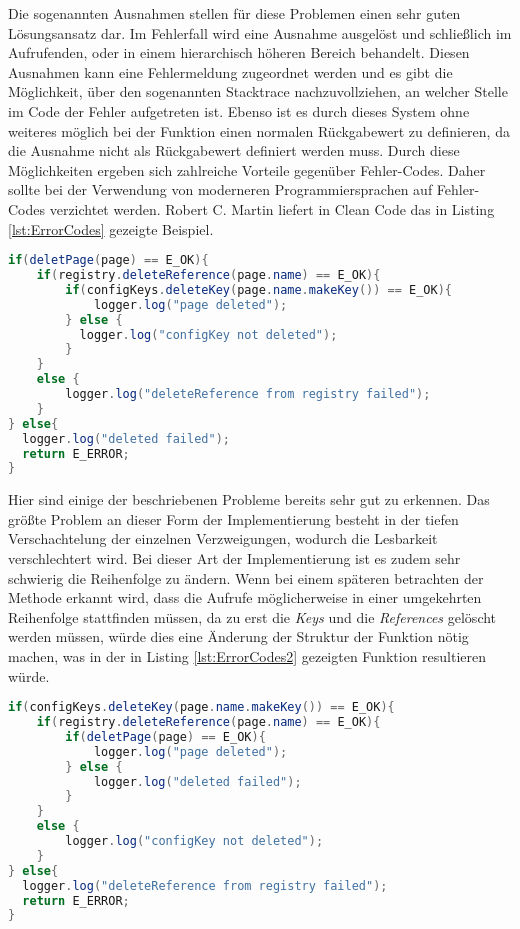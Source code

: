 \SuperPar Die sogenannten Ausnahmen stellen für diese Problemen einen sehr guten Lösungsansatz dar. Im Fehlerfall wird eine Ausnahme ausgelöst und schließlich im Aufrufenden, oder in einem hierarchisch höheren Bereich behandelt. Diesen Ausnahmen kann eine Fehlermeldung zugeordnet werden und es gibt die Möglichkeit, über den sogenannten Stacktrace nachzuvollziehen, an welcher Stelle im Code der Fehler aufgetreten ist. Ebenso ist es durch dieses System ohne weiteres möglich bei der Funktion einen normalen Rückgabewert zu definieren, da die Ausnahme nicht als Rückgabewert definiert werden muss. Durch diese Möglichkeiten ergeben sich zahlreiche Vorteile gegenüber Fehler-Codes. Daher sollte bei der Verwendung von moderneren Programmiersprachen auf Fehler-Codes verzichtet werden. Robert C. Martin liefert in Clean Code \cite[Seite 78]{Martin2008} das in Listing \ref{lst:ErrorCodes} gezeigte Beispiel.

\begin{lstlisting}[language={Java}, caption=Beispiel für die Verwendung von Fehler-Codes, label=lst:ErrorCodes]
if(deletPage(page) == E_OK){
    if(registry.deleteReference(page.name) == E_OK){
        if(configKeys.deleteKey(page.name.makeKey()) == E_OK){
            logger.log("page deleted");
        } else {
          logger.log("configKey not deleted");  
        }
    }
    else {
        logger.log("deleteReference from registry failed");
    }
} else{
  logger.log("deleted failed");
  return E_ERROR;
}
\end{lstlisting}

\SuperPar Hier sind einige der beschriebenen Probleme bereits sehr gut zu erkennen. Das größte Problem an dieser Form der Implementierung besteht in der tiefen Verschachtelung der einzelnen Verzweigungen, wodurch die Lesbarkeit verschlechtert wird. Bei dieser Art der Implementierung ist es zudem sehr schwierig die Reihenfolge zu ändern. Wenn bei einem späteren betrachten der Methode erkannt wird, dass die Aufrufe möglicherweise in einer umgekehrten Reihenfolge stattfinden müssen, da zu erst die \textit{Keys} und die \textit{References} gelöscht werden müssen, würde dies eine Änderung der Struktur der Funktion nötig machen, was in der in Listing \ref{lst:ErrorCodes2} gezeigten Funktion resultieren würde. 

\begin{lstlisting}[language={Java}, caption=Geänderte Reihenfolge der Aufrufe, label=lst:ErrorCodes2]
if(configKeys.deleteKey(page.name.makeKey()) == E_OK){
    if(registry.deleteReference(page.name) == E_OK){
        if(deletPage(page) == E_OK){
            logger.log("page deleted");           
        } else {
            logger.log("deleted failed");
        }
    }
    else {
        logger.log("configKey not deleted");  
    }
} else{
  logger.log("deleteReference from registry failed");
  return E_ERROR;
}
\end{lstlisting}

